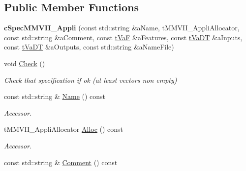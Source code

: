\subsection*{Public Member Functions}
\begin{DoxyCompactItemize}
\item 
{\bfseries c\+Spec\+M\+M\+V\+I\+I\+\_\+\+Appli} (const std\+::string \&a\+Name, t\+M\+M\+V\+I\+I\+\_\+\+Appli\+Allocator, const std\+::string \&a\+Comment, const \hyperlink{classMMVII_1_1cSpecMMVII__Appli_a3af3559a929dd6b4e691685fcf65c82f}{t\+VaF} \&a\+Features, const \hyperlink{classMMVII_1_1cSpecMMVII__Appli_a176c2d528029d322f10e428059c85b06}{t\+Va\+DT} \&a\+Inputs, const \hyperlink{classMMVII_1_1cSpecMMVII__Appli_a176c2d528029d322f10e428059c85b06}{t\+Va\+DT} \&a\+Outputs, const std\+::string \&a\+Name\+File)\hypertarget{classMMVII_1_1cSpecMMVII__Appli_a9caa691f2510368f3ca30c9e4d66026e}{}\label{classMMVII_1_1cSpecMMVII__Appli_a9caa691f2510368f3ca30c9e4d66026e}

\item 
void \hyperlink{classMMVII_1_1cSpecMMVII__Appli_a2f069b1ac63631bba32fec27a29c3f91}{Check} ()\hypertarget{classMMVII_1_1cSpecMMVII__Appli_a2f069b1ac63631bba32fec27a29c3f91}{}\label{classMMVII_1_1cSpecMMVII__Appli_a2f069b1ac63631bba32fec27a29c3f91}

\begin{DoxyCompactList}\small\item\em Check that specification if ok (at least vectors non empty) \end{DoxyCompactList}\item 
const std\+::string \& \hyperlink{classMMVII_1_1cSpecMMVII__Appli_a0c0bc1f98c1ef2d140db56e63e522069}{Name} () const \hypertarget{classMMVII_1_1cSpecMMVII__Appli_a0c0bc1f98c1ef2d140db56e63e522069}{}\label{classMMVII_1_1cSpecMMVII__Appli_a0c0bc1f98c1ef2d140db56e63e522069}

\begin{DoxyCompactList}\small\item\em Accessor. \end{DoxyCompactList}\item 
t\+M\+M\+V\+I\+I\+\_\+\+Appli\+Allocator \hyperlink{classMMVII_1_1cSpecMMVII__Appli_a8b0b72a92b8e41aba5e7de1cc5614fcd}{Alloc} () const \hypertarget{classMMVII_1_1cSpecMMVII__Appli_a8b0b72a92b8e41aba5e7de1cc5614fcd}{}\label{classMMVII_1_1cSpecMMVII__Appli_a8b0b72a92b8e41aba5e7de1cc5614fcd}

\begin{DoxyCompactList}\small\item\em Accessor. \end{DoxyCompactList}\item 
const std\+::string \& \hyperlink{classMMVII_1_1cSpecMMVII__Appli_a30ef632b81d4ebabb79b9a8e21db4fb5}{Comment} () const \hypertarget{classMMVII_1_1cSpecMMVII__Appli_a30ef632b81d4ebabb79b9a8e21db4fb5}{}\label{classMMVII_1_1cSpecMMVII__Appli_a30ef632b81d4ebabb79b9a8e21db4fb5}


\end{DoxyCompactItemize}
